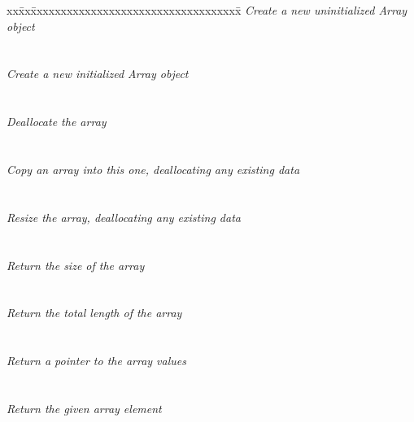 \begin{tabbing}
xx\=xx\=xxxxxxxxxxxxxxxxxxxxxxxxxxxxxxxxxxx\= \kill
\> \todo \> \textit{Create a new uninitialized Array object} \\
\>       \>  \\ \\
\> \todo \> \textit{Create a new initialized Array object} \\
\>       \>  \\ \\
\> \todo \> \textit{Deallocate the array} \\
\>       \>   \\ \\
\> \todo \> \textit{Copy an array into this one, deallocating any existing data} \\
\>       \>   \\ \\
\> \todo \> \textit{Resize the array, deallocating any existing data} \\
\>       \>    \\ \\
\> \todo \> \textit{Return the size of the array} \\
\>       \>   \\ \\
\> \todo \> \textit{Return the total length of the array} \\
\>       \>   \\ \\
\> \todo \> \textit{Return a pointer to the array values} \\
\>       \>   \\ \\
\> \todo \> \textit{Return the given array element} \\
\>       \> 
\end{tabbing}


